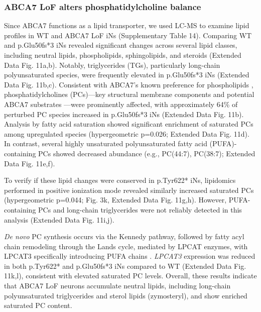 \subsubsection{ABCA7 LoF alters phosphatidylcholine balance}
Since ABCA7 functions as a lipid transporter, we used LC-MS to examine lipid profiles in WT and ABCA7 LoF iNs (Supplementary Table 14). Comparing WT and p.Glu50fs*3 iNs revealed significant changes across several lipid classes, including neutral lipids, phospholipids, sphingolipids, and steroids (Extended Data Fig. 11a,b). Notably, triglycerides (TGs), particularly long-chain polyunsaturated species, were frequently elevated in p.Glu50fs*3 iNs (Extended Data Fig. 11b,c).
Consistent with ABCA7's known preference for phospholipids \supercite{Tomioka2017-sq,Picataggi2022-hf,Fang2025}, phosphatidylcholines (PCs)—key structural membrane components and potential ABCA7 substrates \supercite{LeThiMy2022-dp,Fang2025}—were prominently affected, with approximately 64\% of perturbed PC species increased in p.Glu50fs*3 iNs (Extended Data Fig. 11b). Analysis by fatty acid saturation showed significant enrichment of saturated PCs among upregulated species (hypergeometric p=0.026; Extended Data Fig. 11d). In contrast, several highly unsaturated polyunsaturated fatty acid (PUFA)-containing PCs showed decreased abundance (e.g., PC(44:7), PC(38:7); Extended Data Fig. 11e,f).

To verify if these lipid changes were conserved in p.Tyr622* iNs, lipidomics performed in positive ionization mode revealed similarly increased saturated PCs (hypergeometric p=0.044; Fig. 3k, Extended Data Fig. 11g,h). However, PUFA-containing PCs and long-chain triglycerides were not reliably detected in this analysis (Extended Data Fig. 11i,j).

\textit{De novo} PC synthesis occurs via the Kennedy pathway, followed by fatty acyl chain remodeling through the Lands cycle, mediated by LPCAT enzymes, with LPCAT3 specifically introducing PUFA chains \supercite{Boumann2003-ew,Wang2019-om,Zhao2008-pq}. \textit{LPCAT3} expression was reduced in both p.Tyr622* and p.Glu50fs*3 iNs compared to WT (Extended Data Fig. 11k,l), consistent with elevated saturated PC levels. Overall, these results indicate that ABCA7 LoF neurons accumulate neutral lipids, including long-chain polyunsaturated triglycerides and sterol lipids (zymosteryl), and show enriched saturated PC content.

